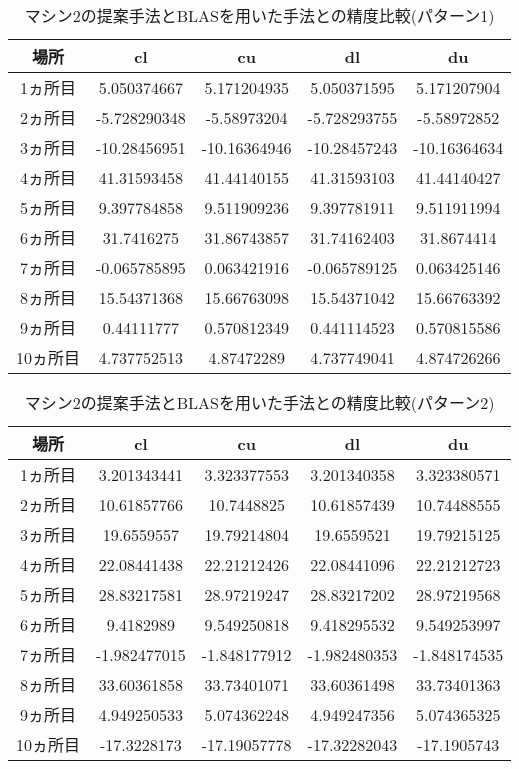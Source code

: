 \documentclass[11pt,a4paper]{jsreport}
\theoremstyle{definition}
\begin{document}
\begin{table}[H]
\centering
\begin{tabular}{|c|c|c|c|c|}
\hline
場所 & cl & cu & dl & du \\ \hline
1ヵ所目 & 5.050374667 & 5.171204935 & 5.050371595 & 5.171207904 \\ \hline
2ヵ所目 & -5.728290348 & -5.58973204 & -5.728293755 & -5.58972852 \\ \hline
3ヵ所目 & -10.28456951 & -10.16364946 & -10.28457243 & -10.16364634 \\ \hline
4ヵ所目 & 41.31593458 & 41.44140155 & 41.31593103 & 41.44140427 \\ \hline
5ヵ所目 & 9.397784858 & 9.511909236 & 9.397781911 & 9.511911994 \\ \hline
6ヵ所目 & 31.7416275 & 31.86743857 & 31.74162403 & 31.8674414 \\ \hline
7ヵ所目 & -0.065785895 & 0.063421916 & -0.065789125 & 0.063425146 \\ \hline
8ヵ所目 & 15.54371368 & 15.66763098 & 15.54371042 & 15.66763392 \\ \hline
9ヵ所目 & 0.44111777 & 0.570812349 & 0.441114523 & 0.570815586 \\ \hline
10ヵ所目 & 4.737752513 & 4.87472289 & 4.737749041 & 4.874726266 \\ \hline
\end{tabular}
\caption{マシン2の提案手法とBLASを用いた手法との精度比較(パターン1)}
\end{table}

\begin{table}[H]
\centering
\begin{tabular}{|c|c|c|c|c|}
\hline
場所 & cl & cu & dl & du \\ \hline
1ヵ所目 & 3.201343441 & 3.323377553 & 3.201340358 & 3.323380571 \\ \hline
2ヵ所目 & 10.61857766 & 10.7448825 & 10.61857439 & 10.74488555 \\ \hline
3ヵ所目 & 19.6559557 & 19.79214804 & 19.6559521 & 19.79215125 \\ \hline
4ヵ所目 & 22.08441438 & 22.21212426 & 22.08441096 & 22.21212723 \\ \hline
5ヵ所目 & 28.83217581 & 28.97219247 & 28.83217202 & 28.97219568 \\ \hline
6ヵ所目 & 9.4182989 & 9.549250818 & 9.418295532 & 9.549253997 \\ \hline
7ヵ所目 & -1.982477015 & -1.848177912 & -1.982480353 & -1.848174535 \\ \hline
8ヵ所目 & 33.60361858 & 33.73401071 & 33.60361498 & 33.73401363 \\ \hline
9ヵ所目 & 4.949250533 & 5.074362248 & 4.949247356 & 5.074365325 \\ \hline
10ヵ所目 & -17.3228173 & -17.19057778 & -17.32282043 & -17.1905743 \\ \hline
\end{tabular}
\caption{マシン2の提案手法とBLASを用いた手法との精度比較(パターン2)}
\end{table}
\end{document}
